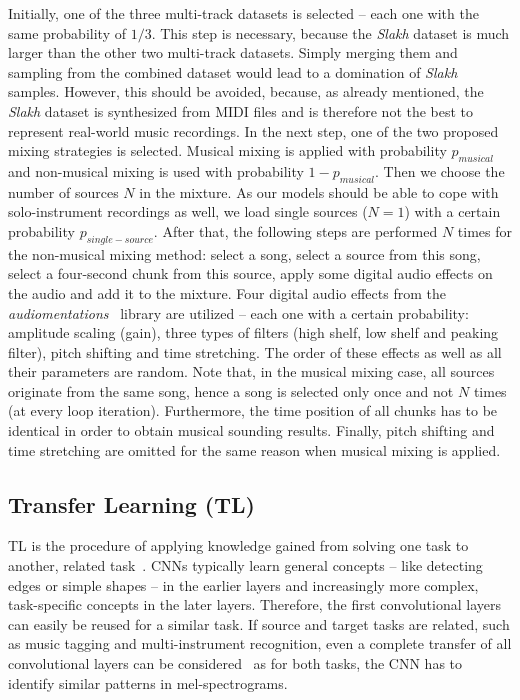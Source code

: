 \documentclass{article}
\begin{document}
Initially, one of the three multi-track datasets is selected -- each one with the same probability of $1/3$. This step is necessary, because the \textit{Slakh} dataset is much larger than the other two multi-track datasets. Simply merging them and sampling from the combined dataset would lead to a domination of \textit{Slakh} samples. However, this should be avoided, because, as already mentioned, the \textit{Slakh} dataset is synthesized from MIDI files and is therefore not the best to represent real-world music recordings. In the next step, one of the two proposed mixing strategies is selected. Musical mixing is applied with probability $p_{musical}$ and non-musical mixing is used with probability $1 - p_{musical}$. Then we choose the number of sources $N$ in the mixture. As our models should be able to cope with solo-instrument recordings as well, we load single sources ($N=1$) with a certain probability $p_{single-source}$. After that, the following steps are performed $N$ times for the non-musical mixing method: select a song, select a source from this song, select a four-second chunk from this source, apply some digital audio effects on the audio and add it to the mixture. Four digital audio effects from the \textit{audiomentations}~\cite{audiomentations} library are utilized -- each one with a certain probability: amplitude scaling (gain), three types of filters (high shelf, low shelf and peaking filter), pitch shifting and time stretching. The order of these effects as well as all their parameters are random. Note that, in the musical mixing case, all sources originate from the same song, hence a song is selected only once and not $N$ times (at every loop iteration). Furthermore, the time position of all chunks has to be identical in order to obtain musical sounding results. Finally, pitch shifting and time stretching are omitted for the same reason when musical mixing is applied.

\subsection{Transfer Learning (TL)}
\label{sec:method:training}
TL is the procedure of applying knowledge gained from solving one task to another, related task~\cite{tan2018survey}. CNNs typically learn general concepts -- like detecting edges or simple shapes -- in the earlier layers and increasingly more complex, task-specific concepts in the later layers. Therefore, the first convolutional layers can easily be reused for a similar task. If source and target tasks are related, such as music tagging and multi-instrument recognition, even a complete transfer of all convolutional layers can be considered~\cite{ribani2019survey} as for both tasks, the CNN has to identify similar patterns in mel-spectrograms.
\end{document}

